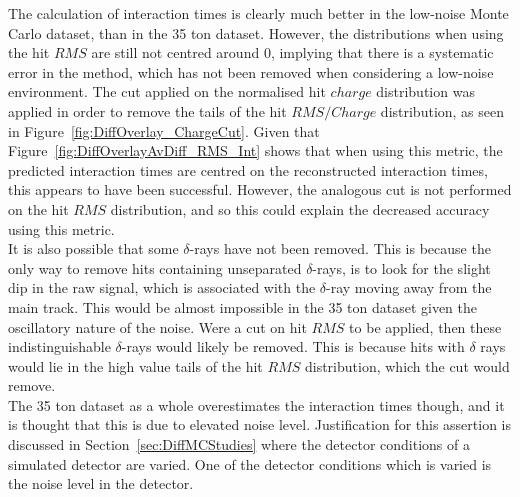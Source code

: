 The calculation of interaction times is clearly much better in the low-noise Monte Carlo dataset, than in the 35 ton dataset. However, the distributions when using the hit $RMS$ are still not centred around 0, implying that there is a systematic error in the method, which has not been removed when considering a low-noise environment. The cut applied on the normalised hit $charge$ distribution was applied in order to remove the tails of the hit $RMS/Charge$ distribution, as seen in Figure~\ref{fig:DiffOverlay_ChargeCut}. Given that Figure~\ref{fig:DiffOverlayAvDiff_RMS_Int} shows that when using this metric, the predicted interaction times are centred on the reconstructed interaction times, this appears to have been successful. However, the analogous cut is not performed on the hit $RMS$ distribution, and so this could explain the decreased accuracy using this metric. \\

It is also possible that some $\delta$-rays have not been removed. This is because the only way to remove hits containing unseparated $\delta$-rays, is to look for the slight dip in the raw signal, which is associated with the $\delta$-ray moving away from the main track. This would be almost impossible in the 35 ton dataset given the oscillatory nature of the noise. Were a cut on hit $RMS$ to be applied, then these indistinguishable $\delta$-rays would likely be removed. This is because hits with $\delta$ rays would lie in the high value tails of the hit $RMS$ distribution, which the cut would remove. \\

The 35 ton dataset as a whole overestimates the interaction times though, and it is thought that this is due to elevated noise level. Justification for this assertion is discussed in Section~\ref{sec:DiffMCStudies} where the detector conditions of a simulated detector are varied. One of the detector conditions which is varied is the noise level in the detector. \\

